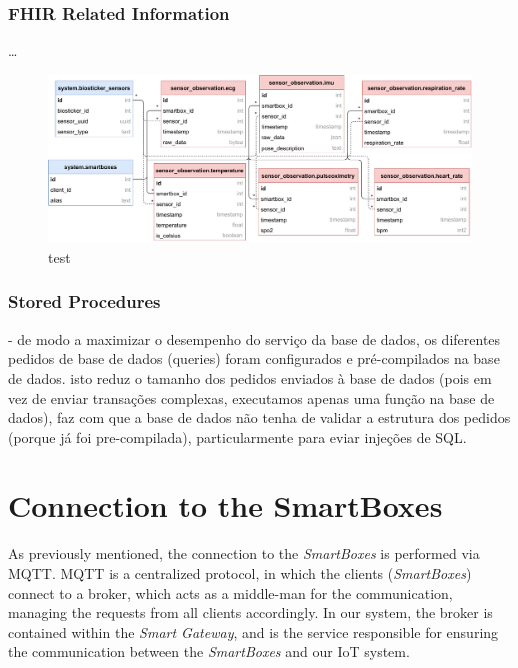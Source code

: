 \subsubsection{FHIR Related Information}
\dots 

\begin{figure}[H]
    \centering
    \includegraphics[width=\linewidth]{images/database-schema-fhir.pdf}
    \caption[test]{test}
    \label{fig:wow-dbschema-fhir}
\end{figure}


\subsubsection{Stored Procedures}

- de modo a maximizar o desempenho do serviço da base de dados, os diferentes pedidos de base de dados (queries) foram configurados e pré-compilados na base de dados. isto reduz o tamanho dos pedidos enviados à base de dados (pois em vez de enviar transações complexas, executamos apenas uma função na base de dados), faz com que a base de dados não tenha de validar a estrutura dos pedidos (porque já foi pre-compilada), particularmente para eviar injeções de SQL.

\section{Connection to the SmartBoxes}

As previously mentioned, the connection to the \textit{SmartBoxes} is performed via \acs{MQTT}. \acs{MQTT} is a centralized protocol, in which the clients (\textit{SmartBoxes}) connect to a broker, which acts as a middle-man for the communication, managing the requests from all clients accordingly. In our system, the broker is contained within the \textit{Smart Gateway}, and is the service responsible for ensuring the communication between the \textit{SmartBoxes} and our \acs{IoT} system.

